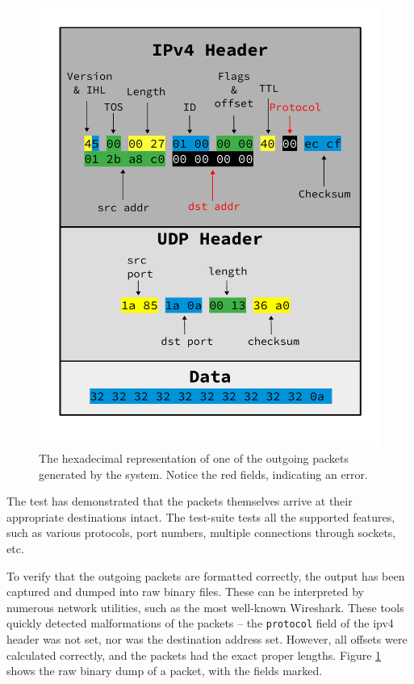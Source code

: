 \begin{figure}[h]
\centering
\includegraphics[scale=0.45]{evaluation/hexdump.pdf}
	\caption{The hexadecimal representation of one of the outgoing packets
	generated by the system. Notice the red fields, indicating an error.}
\label{fig:packet_hexdump}
\end{figure}

The test has demonstrated that the packets themselves arrive at their
appropriate destinations intact. The test-suite tests all the supported
features, such as various protocols, port numbers, multiple connections through
sockets, etc.

To verify that the outgoing packets are formatted correctly, the output has
been captured and dumped into raw binary files. These can be interpreted by
numerous network utilities, such as the most well-known Wireshark.
These tools quickly detected malformations of the packets -- the
\texttt{protocol} field of the \gls{ipv4} header was not set, nor was the
destination address set. However, all offsets were calculated correctly, and
the packets had the exact proper lengths. Figure
\ref{fig:packet_hexdump} shows the raw binary dump of a packet, with the fields
marked.


